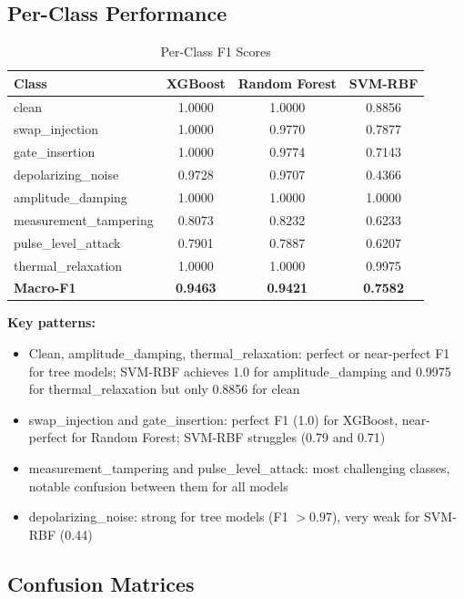 \subsection{Per-Class Performance}

\begin{table}[H]
\centering
\caption{Per-Class F1 Scores}
\label{tab:per_class_f1}
\begin{tabular}{lccc}
\toprule
\textbf{Class} & \textbf{XGBoost} & \textbf{Random Forest} & \textbf{SVM-RBF} \\
\midrule
clean & 1.0000 & 1.0000 & 0.8856 \\
swap\_injection & 1.0000 & 0.9770 & 0.7877 \\
gate\_insertion & 1.0000 & 0.9774 & 0.7143 \\
depolarizing\_noise & 0.9728 & 0.9707 & 0.4366 \\
amplitude\_damping & 1.0000 & 1.0000 & 1.0000 \\
measurement\_tampering & 0.8073 & 0.8232 & 0.6233 \\
pulse\_level\_attack & 0.7901 & 0.7887 & 0.6207 \\
thermal\_relaxation & 1.0000 & 1.0000 & 0.9975 \\
\midrule
\textbf{Macro-F1} & \textbf{0.9463} & \textbf{0.9421} & \textbf{0.7582} \\
\bottomrule
\end{tabular}
\end{table}

\textbf{Key patterns:}
\begin{itemize}
    \item Clean, amplitude\_damping, thermal\_relaxation: perfect or near-perfect F1 for tree models; SVM-RBF achieves 1.0 for amplitude\_damping and 0.9975 for thermal\_relaxation but only 0.8856 for clean
    \item swap\_injection and gate\_insertion: perfect F1 (1.0) for XGBoost, near-perfect for Random Forest; SVM-RBF struggles (0.79 and 0.71)
    \item measurement\_tampering and pulse\_level\_attack: most challenging classes, notable confusion between them for all models
    \item depolarizing\_noise: strong for tree models (F1 $>0.97$), very weak for SVM-RBF (0.44)
\end{itemize}

\subsection{Confusion Matrices}

